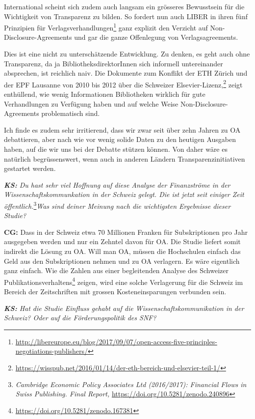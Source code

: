 \documentclass[a4paper,
fontsize=11pt,
oneside,
numbers=noperiodatend,
parskip=half-,
bibliography=totoc,
final
]{scrartcl}
\begin{document}
International scheint sich zudem auch langsam ein grösseres Bewusstsein
für die Wichtigkeit von Transparenz zu bilden. So fordert nun auch LIBER
in ihren fünf Prinzipien für Verlagsverhandlungen\footnote{\url{http://libereurope.eu/blog/2017/09/07/open-access-five-principles-negotiations-publishers/}}
ganz explizit den Verzicht auf Non-Disclosure-Agreements und gar die
ganze Offenlegung von Verlagsagreements.

Dies ist eine nicht zu unterschätzende Entwicklung. Zu denken, es geht
auch ohne Transparenz, da ja BibliotheksdirektorInnen sich informell
untereinander absprechen, ist reichlich naiv. Die Dokumente zum Konflikt
der ETH Zürich und der EPF Lausanne von 2010 bis 2012 über die Schweizer
Elsevier-Lizenz,\footnote{\url{https://wisspub.net/2016/01/14/der-eth-bereich-und-elsevier-teil-1/}}
zeigt enthüllend, wie wenig Informationen Bibliotheken wirklich für gute
Verhandlungen zu Verfügung haben und auf welche Weise
Non-Disclosure-Agreements problematisch sind.

Ich finde es zudem sehr irritierend, dass wir zwar seit über zehn Jahren
zu OA debattieren, aber nach wie vor wenig solide Daten zu den heutigen
Ausgaben haben, auf die wir uns bei der Debatte stützen können. Von
daher wäre es natürlich begrüssenswert, wenn auch in anderen Ländern
Transparenzinitiativen gestartet werden.

\emph{\textbf{KS:} Du hast sehr viel Hoffnung auf diese Analyse der
Finanzströme in der Wissenschaftskommunkation in der Schweiz gelegt. Die
ist jetzt seit einiger Zeit öffentlich.}\footnote{\emph{Cambridge
  Economic Policy Associates Ltd (2016/2017): Financial Flows in Swiss
  Publishing. Final Report,} \url{https://doi.org/10.5281/zenodo.240896}}\emph{Was
sind deiner Meinung nach die wichtigsten Ergebnisse dieser Studie?}

\textbf{CG:} Dass in der Schweiz etwa 70 Millionen Franken für
Subskriptionen pro Jahr ausgegeben werden und nur ein Zehntel davon für
OA. Die Studie liefert somit indirekt die Lösung zu OA. Will man OA,
müssen die Hochschulen einfach das Geld aus den Subskriptionen nehmen
und zu OA verlagern. Es wäre eigentlich ganz einfach. Wie die Zahlen aus
einer begleitenden Analyse des Schweizer
Publikationsverhaltens\footnote{\url{https://doi.org/10.5281/zenodo.167381}}
zeigen, wird eine solche Verlagerung für die Schweiz im Bereich der
Zeitschriften mit grossen Kosteneinsparungen verbunden sein.

\emph{\textbf{KS:} Hat die Studie Einfluss gehabt auf die
Wissenschaftskommunikation in der Schweiz? Oder auf die
Förderungspolitik des SNF?}
\end{document}
